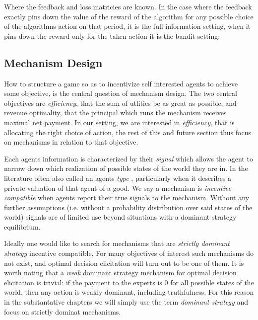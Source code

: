 Where the feedback and loss matricies are known. In the case where the feedback exactly pins down the value of the reward of the algorithm for any possible choice of the algorithms action on that period, it is the full information setting, when it pins down the reward only for the taken action it is the bandit setting.


\subsection{Mechanism Design}

How to structure a game so as to incentivize self interested agents to achieve some objective, is the central question of mechanism design.
The two central objectives are \emph{efficiency}, that the sum of utlities be as great as possible, and revenue optimality, that the principal which runs the mechanism receives maximal net payment.
In our setting, we are interested in \emph{efficiency}, that is allocating the right choice of action, the rest of this and future section thus focus on mechanisms in relation to that objective.

Each agents information is characterized by their \emph{signal} which allows the agent to narrow down which realization of possible states of the world they are in. In the literature often also called an agents \emph{type} , particularly when it describes a private valuation of that agent of a good.
We say a mechanism is \emph{incentive compatible} when agents report their true signals to the mechanism. 
Without any further assumptions (i.e. without a probability distribution over said states of the world) signals are of limited use beyond situations with a dominant strategy equilibrium.

Ideally one would like to search for mechanisms that are  \emph{strictly dominant strategy} incentive compatible.
For many objectives of interest such mechanisms do not exist, and optimal decision elicitation will turn out to be one of them. 
It is worth noting that a \emph{weak} dominant strategy mechanism for optimal decision elicitation is trivial: if the payment to the experts is 0 for all possible states of the world, then any action is weakly dominant, including truthfulness. 
For this reason in the substantative chapters we will simply use the term \emph{dominant strategy} and focus on strictly dominat mechanisms. 

